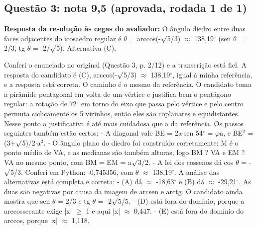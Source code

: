\documentclass{article}%
\begin{document}
\subsection*{Questão 3: nota 9,5 (aprovada, rodada 1 de 1)}%
\textbf{Resposta da resolução às cegas do avaliador:} O ângulo diedro entre duas faces adjacentes do icosaedro regular é $\theta$ = arccos(-$\surd$5/3) $\approx$ 138,19$^\circ$ (sen $\theta$ = 2/3, tg $\theta$ = -2/$\surd$5). Alternativa (C).\par %
Conferi o enunciado no original (Questão 3, p. 2/12) e a transcrição está fiel. A resposta do candidato é (C), arccos(-$\surd$5/3) $\approx$ 138,19$^\circ$, igual à minha referência, e a resposta está correta.\newline%
\newline%
O caminho é o mesmo da referência. O candidato toma a pirâmide pentagonal em volta de um vértice e justifica bem o pentágono regular: a rotação de 72$^\circ$ em torno do eixo que passa pelo vértice e pelo centro permuta ciclicamente os 5 vizinhos, então eles são coplanares e equidistantes. Nesse ponto a justificativa é até mais cuidadosa que a da referência.\newline%
\newline%
Os passos seguintes também estão certos:\newline%
{-} A diagonal vale BE = 2a$\cdot$sen 54$^\circ$ = $\varphi$a, e BE$^2$ = (3+$\surd$5)/2$\cdot$a$^2$.\newline%
{-} O ângulo plano do diedro foi construído corretamente: M é o ponto médio de VA, e as medianas são também alturas, logo BM ? VA e EM ? VA no mesmo ponto, com BM = EM = a$\surd$3/2.\newline%
{-} A lei dos cossenos dá cos $\theta$ = -$\surd$5/3. Conferi em Python: -0,745356, com $\theta$ $\approx$ 138,19$^\circ$.\newline%
\newline%
A análise das alternativas está completa e correta:\newline%
{-} (A) dá $\approx$ -18,63$^\circ$ e (B) dá $\approx$ -29,21$^\circ$. As duas são negativas por causa da imagem de arcsen e arctg. O candidato ainda mostra que sen $\theta$ = 2/3 e tg $\theta$ = -2$\surd$5/5.\newline%
{-} (D) está fora do domínio, porque a arccossecante exige |x| $\geq$ 1 e aqui |x| $\approx$ 0,447.\newline%
{-} (E) está fora do domínio do arccos, porque |x| $\approx$ 1,118.\newline%
\end{document}
